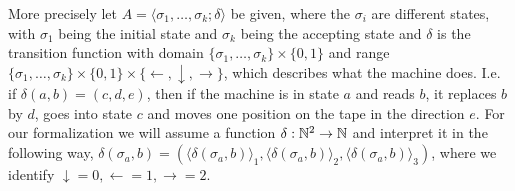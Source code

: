 \documentclass{LMCS}
\newcommand{\Nat}{\ensuremath \mathbb N}
\begin{document}
More precisely let $A=\langle\sigma_1,\dots,\sigma_k; \delta\rangle$ be given, where the $\sigma_i$ are
different states, with $\sigma_1$ being the initial state and $\sigma_k$ being the accepting state and $\delta$
is the transition function with domain $\{\sigma_1,\dots,\sigma_k\}\times\{0,1\}$ and range
$\{\sigma_1,\dots,\sigma_k\}\times\{0,1\}\times\{\leftarrow,\downarrow,\rightarrow\}$, which describes what the
machine does. I.e. if $\delta(a,b)=(c,d,e)$, then if the machine is in state $a$ and reads $b$, it replaces $b$
by $d$, goes into state $c$ and moves one position on the tape in the direction $e$. For our formalization we
will assume a function $\delta:\Nat^2\rightarrow\Nat$ and interpret it in the following way,
$\delta(\sigma_a,b)=(\langle\delta(\sigma_a,b)\rangle_1,\langle\delta(\sigma_a,b)\rangle_2,
\langle\delta(\sigma_a,b)\rangle_3)$, where we identify $\downarrow=0,\leftarrow=1,\rightarrow=2$.
\end{document}
